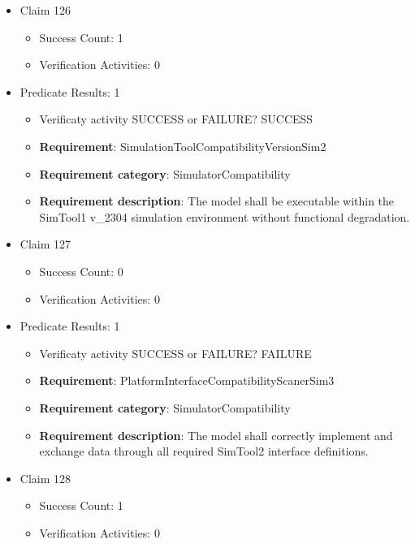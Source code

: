 \documentclass{article}
\begin{document}
\begin{itemize}
  				  \item Claim 126
				\begin{itemize}
			    	\item Success Count: 1 
			    	\item Verification Activities: 0
				\end{itemize}
				
									    
				\item Predicate Results: 1
					\begin{itemize}				
					\item Verificaty activity SUCCESS or FAILURE? SUCCESS
					
					\item \textbf{Requirement}: SimulationToolCompatibilityVersionSim2 
					\item \textbf{Requirement category}: SimulatorCompatibility
					\item \textbf{Requirement description}: The model shall be executable within the SimTool1 v_2304 simulation environment without functional degradation.
					\end{itemize}

  				  \item Claim 127
				\begin{itemize}
			    	\item Success Count: 0 
			    	\item Verification Activities: 0
				\end{itemize}
				
									    
				\item Predicate Results: 1
					\begin{itemize}				
					\item Verificaty activity SUCCESS or FAILURE? FAILURE
					
					\item \textbf{Requirement}: PlatformInterfaceCompatibilityScanerSim3 
					\item \textbf{Requirement category}: SimulatorCompatibility
					\item \textbf{Requirement description}: The model shall correctly implement and exchange data through all required SimTool2 interface definitions.
					\end{itemize}

  				  \item Claim 128
				\begin{itemize}
			    	\item Success Count: 1 
			    	\item Verification Activities: 0
				\end{itemize}
				

\end{itemize}
\end{document}

